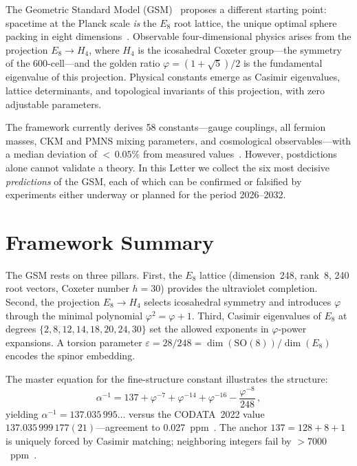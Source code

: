 \documentclass[aps,prl,twocolumn,superscriptaddress,nofootinbib]{revtex4-2}
\newcommand{\vp}{\varphi}
\newcommand{\eps}{\varepsilon}
\begin{document}
The Geometric Standard Model (GSM)~\cite{mcgirl2026gsm} proposes a different
starting point: spacetime at the Planck scale \emph{is} the $E_8$ root lattice,
the unique optimal sphere packing in eight dimensions~\cite{viazovska2016}.
Observable four-dimensional physics arises from the projection $E_8 \to H_4$, where
$H_4$ is the icosahedral Coxeter group---the symmetry of the 600-cell---and the
golden ratio $\vp = (1+\sqrt{5})/2$ is the fundamental eigenvalue of this projection.
Physical constants emerge as Casimir eigenvalues, lattice determinants, and topological
invariants of this projection, with zero adjustable parameters.

The framework currently derives 58 constants---gauge couplings, all fermion masses,
CKM and PMNS mixing parameters, and cosmological observables---with a median
deviation of ${<}\,0.05\%$ from measured values~\cite{mcgirl2026gsm}.
However, postdictions alone cannot validate a theory.
In this Letter we collect the six most decisive \emph{predictions} of the GSM,
each of which can be confirmed or falsified by experiments either underway or
planned for the period 2026--2032.

\section{Framework Summary}

The GSM rests on three pillars.  First, the $E_8$ lattice (dimension~248,
rank~8, 240 root vectors, Coxeter number $h=30$) provides the ultraviolet
completion.  Second, the projection $E_8 \to H_4$ selects icosahedral
symmetry and introduces $\vp$ through the minimal polynomial
$\vp^2 = \vp + 1$.  Third, Casimir eigenvalues of $E_8$ at degrees
$\{2,8,12,14,18,20,24,30\}$ set the allowed exponents in $\vp$-power
expansions.  A torsion parameter $\eps = 28/248 = \dim(\mathrm{SO}(8))/\dim(E_8)$
encodes the spinor embedding.

The master equation for the fine-structure constant illustrates the structure:
\begin{equation}
  \alpha^{-1} = 137 + \vp^{-7} + \vp^{-14} + \vp^{-16}
                - \frac{\vp^{-8}}{248}\,,
  \label{eq:alpha}
\end{equation}
yielding $\alpha^{-1} = 137.035\,995\ldots$ versus the CODATA~2022 value
$137.035\,999\,177(21)$---agreement to 0.027~ppm~\cite{codata2022}.
The anchor $137 = 128 + 8 + 1$ is uniquely forced by Casimir matching;
neighboring integers fail by $>7000$~ppm~\cite{mcgirl2026gsm}.
\end{document}
